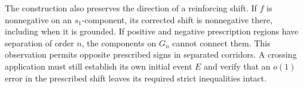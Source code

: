 The construction also preserves the direction of a reinforcing shift.
If $f$ is nonnegative on an $s_1$-component, its corrected shift is
nonnegative there, including when it is grounded. If positive and negative
prescription regions have separation of order $n$, the components on $G_n$
cannot connect them. This observation permits opposite prescribed signs
in separated corridors. A crossing application must still establish its
own initial event $E$ and verify that an $o(1)$ error in the prescribed
shift leaves its required strict inequalities intact.
